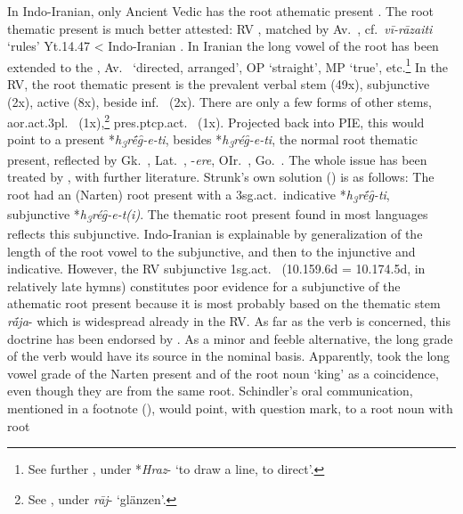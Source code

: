 \documentclass[output=paper,colorlinks,citecolor=brown]{langscibook}
\begin{document}
In Indo-Iranian, only Ancient Vedic has the root athematic present .  The root thematic present is much better attested: RV , matched by Av.\  \mbox{,} cf.\  \textit{vī-rāzaiti} ‘rules’ Yt.14.47 < Indo-Iranian . In Iranian the long vowel of the root has been extended to the , Av.\  ‘directed, arranged’, OP  ‘straight’, MP  ‘true’, etc.\footnote{See further \citealt[196--198]{Cheung2007}, under *\textit{Hraz}- ‘to draw a line, to direct’.} In the RV, the root thematic present \mbox{} is the prevalent verbal stem (49x), subjunctive (2x),  active  (8x), beside inf.\  (2x). There are only a few forms of other stems, aor.act.3pl.\  (1x),\footnote{See \citealt[221--222]{Narten1964}, under \textit{rāj}- ‘glänzen’.}  pres.ptcp.act.\   (1x). Projected back into PIE, this would point to a present  *\textit{h\textsubscript{3}rḗg̑-e-ti}, besides   *\textit{h\textsubscript{3}rég̑-e-ti}, the normal root thematic present, reflected by Gk.\ , Lat.\ , -\textit{ere}, OIr.\  , Go.\ .  The whole issue has been treated by \citet{Strunk1987}, with further literature. Strunk’s own solution (\citeyear[389--390]{Strunk1987}) is as follows: The root  had an  (Narten) root present with a 3sg.act.\ indicative *\textit{h\textsubscript{3}rḗg̑-ti}, subjunctive *\textit{h\textsubscript{3}rég̑-e-t(i)}. The thematic root present found in most languages reflects this subjunctive. Indo-Iranian \mbox{} is explainable by generalization of the length of the root vowel to the subjunctive, and then to the injunctive and indicative. However, the RV subjunctive 1sg.act.\  (10.159.6d = 10.174.5d, in relatively late hymns) constitutes poor evidence for a subjunctive of the athematic root present because it is most probably based on the thematic stem \textit{rā́ja}- which is widespread already in the RV.  As far as the verb is concerned, this doctrine has been endorsed by . As a minor and feeble alternative, the long grade of the verb would have its source in the nominal basis. Apparently, \citet{Strunk1987} took the long vowel grade of the Narten present and of the root noun ‘king’ as a coincidence, even though they are from the same root. Schindler’s oral communication, mentioned in a footnote (\citeyear[390, fn.\ 3]{Strunk1987}), would point, with question mark, to a root noun with  root 
\end{document}
